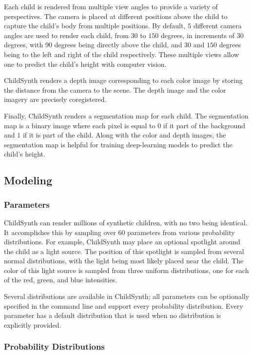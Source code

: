 \documentclass{article}
\begin{document}
Each child is rendered from multiple view angles to provide a variety of perspectives. The camera is placed at different positions above the child to capture the child's body from multiple positions. By default, $5$ different camera angles are used to render each child, from $30$ to $150$ degrees, in increments of $30$ degrees, with $90$ degrees being directly above the child, and $30$ and $150$ degrees being to the left and right of the child respectively. These multiple views allow one to predict the child's height with computer vision.

ChildSynth renders a depth image corresponding to each color image by storing the distance from the camera to the scene. The depth image and the color imagery are precisely coregistered.

Finally, ChildSynth renders a segmentation map for each child. The segmentation map is a binary image where each pixel is equal to $0$ if it part of the background and $1$ if it is part of the child. Along with the color and depth images, the segmentation map is helpful for training deep-learning models to predict the child's height.


\subsection{Modeling}

\subsubsection{Parameters}

ChildSynth can render millions of synthetic children, with no two being identical.  It accomplishes this by sampling over $60$ parameters from various probability distributions. For example, ChildSynth may place an optional spotlight around the child as a light source. The position of this spotlight is sampled from several normal distributions, with the light being most likely placed near the child. The color of this light source is sampled from three uniform distributions, one for each of the red, green, and blue intensities. 

Several distributions are available in ChildSynth; all parameters can be optionally specified in the command line and support every probability distribution. Every parameter has a default distribution that is used when no distribution is explicitly provided.

\subsubsection{Probability Distributions}
\end{document}

